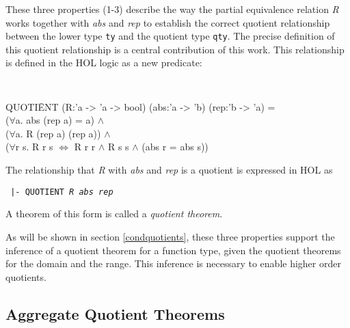 \documentclass[envcountsame,runningheads]{llncs}
\newcommand{\quotient}{partial equivalence}
\begin{document}
These three properties (1-3) describe the way
the \quotient{} relation {\it R\/} works together with 
{\it abs\/} and {\it rep}
to establish the correct
quotient relationship between the lower type {\tt ty}
and the quotient type {\tt qty}.
The precise definition of this quotient relationship
is a central contribution of this work.
This relationship is defined in the HOL logic as a new predicate:
{\tt
\begin{tabbing}
\hspace{3.5mm}
  QUOTI\=ENT  (R:'a -> 'a -> bool) (abs:'a -> 'b) (rep:'b -> 'a) = \\
\>       ($\forall$a. abs (rep a) = a) $\wedge$ \\
\>       ($\forall$a. R (rep a) (rep a)) $\wedge$ \\
\>       ($\forall$r s. R r s $\Leftrightarrow$ R r r $\wedge$ R s s $\wedge$ (abs r = abs s))
\end{tabbing}}

\noindent
The relationship that {\it R\/}
with
{\it abs\/} and {\it rep}
is a quotient is
expressed in HOL as
\begin{center}
\tt
|- QUOTIENT {\it R\/} {\it abs\/} {\it rep}
\end{center}

\noindent
A theorem of this form is called a {\it quotient theorem}.

As will be shown in section
\ref{condquotients},
these three properties support the inference of a quotient theorem for a 
function type, given the quotient theorems for the domain and the range.
This inference is necessary to enable higher order quotients.


%
\subsection{Aggregate Quotient Theorems}
%
\label{aggregates}

\end{document}
